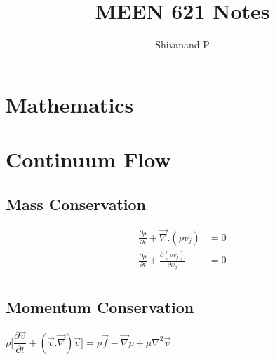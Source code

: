 \documentclass[10pt, letterpaper, notitlepage, landscape]{article}
\title{MEEN 621 Notes}
\author{Shivanand P}
\begin{document}
\sffamily
\sffamily{}

\maketitle
\renewcommand{\cftpartleader}{\cftdotfill{\cftdotsep}} %
\renewcommand{\cftsecleader}{\cftdotfill{\cftdotsep}}
\tableofcontents
\pagestyle{empty}

\newpage
\setcounter{page}{1}

\pagestyle{fancy}
\fancyhead{}    
\fancyfoot{}
\renewcommand{\headrulewidth}{0pt}
\renewcommand{\footrulewidth}{0pt}
\renewcommand{\arraystretch}{1.75}

\section{Mathematics}

\section{Continuum Flow}
\subsection{Mass Conservation}
\begin{align*}
\frac{\partial \rho}{\partial t} + \vec{\nabla} . (\rho v_j) &= 0 \\
\frac{\partial \rho}{\partial t} + \frac{\partial (\rho v_j)}{\partial x_j} &= 0 \\
\end{align*}

\subsection{Momentum Conservation}
$\rho \biggl[\dfrac{\partial{\vec{v}}}{\partial t} + (\vec{v}.\vec{\nabla})\vec{v}\biggr] = \rho \vec{f} -\vec{\nabla} p + \mu \nabla^2 \vec{v}$
\end{document}
